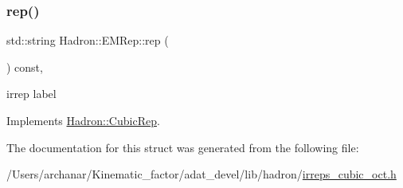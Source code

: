 \subsubsection{\texorpdfstring{rep()}{rep()}\hspace{0.1cm}{\footnotesize\ttfamily [2/2]}}
{\footnotesize\ttfamily std\+::string Hadron\+::\+E\+M\+Rep\+::rep (\begin{DoxyParamCaption}{ }\end{DoxyParamCaption}) const\hspace{0.3cm}{\ttfamily [inline]}, {\ttfamily [virtual]}}

irrep label 

Implements \mbox{\hyperlink{structHadron_1_1CubicRep_ac3eb63608803d44c68681f158e14eb1b}{Hadron\+::\+Cubic\+Rep}}.



The documentation for this struct was generated from the following file\+:\begin{DoxyCompactItemize}
\item 
/\+Users/archanar/\+Kinematic\+\_\+factor/adat\+\_\+devel/lib/hadron/\mbox{\hyperlink{lib_2hadron_2irreps__cubic__oct_8h}{irreps\+\_\+cubic\+\_\+oct.\+h}}\end{DoxyCompactItemize}
